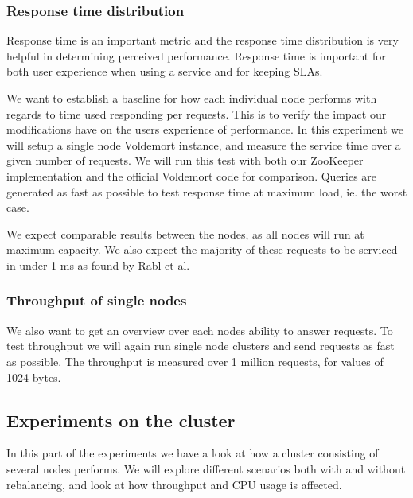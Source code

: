 \subsubsection{Response time distribution}
Response time is an important metric and the response time distribution is very helpful in determining perceived performance. Response time is important for both user experience when using a service and for keeping SLAs.

We want to establish a baseline for how each individual node performs with regards to time used responding per requests. This is to verify the impact our modifications have on the users experience of performance. In this experiment we will setup a single node Voldemort instance, and measure the service time over a given number of requests. We will run this test with both our ZooKeeper implementation and the official Voldemort code for comparison. 
Queries are generated as fast as possible to test response time at maximum load, ie. the worst case.

We expect comparable results between the nodes, as all nodes will run at maximum capacity. We also expect the majority of these requests to be serviced in under 1 ms as found by Rabl et al\cite{Rabl:2012:SBD:2367502.2367512}.

\subsubsection{Throughput of single nodes}
We also want to get an overview over each nodes ability to answer requests. To test throughput we will again run single node clusters and send requests as fast as possible. The throughput is measured over 1 million requests, for values of 1024 bytes.


\subsection{Experiments on the cluster}
In this part of the experiments we have a look at how a cluster consisting of several nodes performs. We will explore different scenarios both with and without rebalancing, and look at how throughput and CPU usage is affected.

